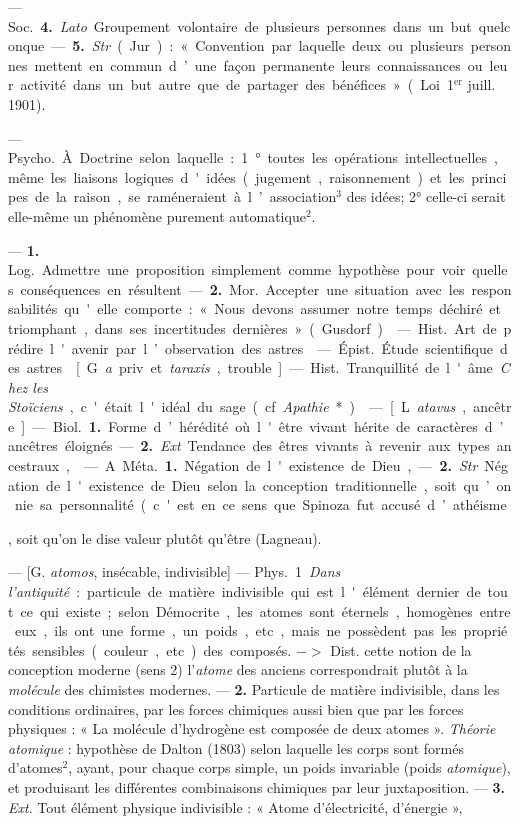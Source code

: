 \begin{itemize}[leftmargin=1cm, label=, itemsep=1pt]
{{{{— \si{Soc.} {\bf 4.} {\it Lato}. Groupement
volontaire de plusieurs personnes
dans un but quelconque. — {\bf 5.} {\it Str}.
(Jur.) : « Convention par laquelle
deux ou plusieurs personnes mettent
en commun d’une façon permanente
leurs connaissances ou leur activité
dans un but autre que de partager
des bénéfices ». (Loi 1$^\text{er}$ juill. 1901).

 — \si{Psycho.} À Doctrine selon laquelle : 1° toutes les
opérations intellectuelles, même les
liaisons logiques d'idées (jugement,
raisonnement) et les principes de la
raison, se raméneraient à l’association$^3$ des idées; 2° celle-ci serait
elle-même un phénomène purement
automatique$^2$.

 — {\bf 1.} \si{Log.} Admettre une
proposition simplement comme hypothèse pour voir quelles
conséquences en résultent.

— {\bf 2.} \si{Mor.} Accepter une situation avec les responsabilités qu'elle
comporte : « Nous devons assumer
notre temps déchiré et triomphant,
dans ses incertitudes dernières »
(Gusdorf).

 — \si{Hist.} Art de prédire
l'avenir par l’observation des astres.

 — \si{Épist.} Étude scientifique des astres.

 [G. {\it a} priv. et {\it taraxis}, trouble]. — \si{Hist.} Tranquillité de l'âme.
{\it Chez les Stoïciens}, c'était l'idéal du
sage (cf. {\it Apathie}*).

 — [L. {\it atavus}, ancêtre] —
\si{Biol.} {\bf 1.} Forme d’hérédité où l'être
vivant hérite de caractères d’ancêtres éloignés. — {\bf 2.} {\it Ext}. Tendance
des êtres vivants à revenir aux types
ancestraux,

 — A \si{Méta.} {\bf 1.} Négation de
l'existence de Dieu, — {\bf 2.} {\it Str}. Négation de l'existence de Dieu selon la
conception traditionnelle, soit qu’on
nie sa personnalité (c'est en ce sens
que Spinoza fut accusé d’athéisme},
soit qu’on le dise valeur plutôt
qu'être (Lagneau).

 — [G. {\it atomos}, insécable, indivisible] — \si{Phys.} 1 {\it Dans l'antiquité} :
particule de matière indivisible qui
est l'élément dernier de tout ce qui
existe; selon Démocrite, les atomes
sont éternels, homogènes entre eux,
ils ont une forme, un poids, etc.,
mais ne possèdent pas les propriétés
sensibles (couleur, etc.) des composés. $->$ Dist. cette notion de la
conception moderne (sens 2)
l'{\it atome} des anciens correspondrait
plutôt à la {\it molécule} des chimistes
modernes. — {\bf 2.} Particule de matière
indivisible, dans les conditions ordinaires, par les forces chimiques
aussi bien que par les forces physiques : « La molécule d'hydrogène
est composée de deux atomes ».
{\it Théorie atomique} : hypothèse de
Dalton (1803) selon laquelle les
corps sont formés d’atomes$^2$, ayant,
pour chaque corps simple, un poids
invariable (poids {\it atomique}), et produisant les différentes combinaisons
chimiques par leur juxtaposition. —
 {\bf 3.} {\it Ext}. Tout élément physique indivisible : « Atome d'électricité,
d'énergie »,

}}}
\end{itemize}

